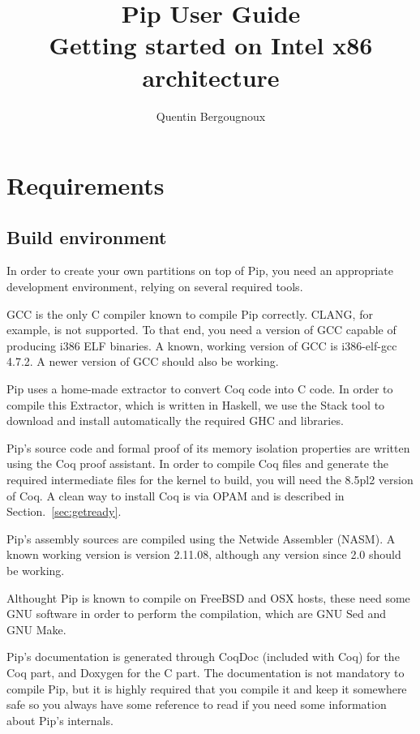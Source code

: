 \documentclass[10pt,a4paper,titlepage]{refart}
\author{Quentin Bergougnoux}
\title{Pip User Guide \\ Getting started on Intel x86 architecture}
\begin{document}
\maketitle
\tableofcontents
{}
\lstlistoflistings
\pagebreak
\section{Requirements}
\subsection{Build environment}
In order to create your own partitions on top of Pip, you need an appropriate development environment, relying on several required tools.

GCC is the only C compiler known to compile Pip correctly. CLANG, for example, is not supported. To that end, you need a version of GCC capable of producing i386 ELF binaries. A known, working version of GCC is i386-elf-gcc 4.7.2. A newer version of GCC should also be working.

Pip uses a home-made extractor to convert Coq code into C code. In order to compile this Extractor, which is written in Haskell, we use the Stack tool to download and install automatically the required GHC and libraries.

Pip's source code and formal proof of its memory isolation properties are written
using the Coq proof assistant. In order to compile Coq files and
generate the required intermediate files for the kernel to build, you will need the 8.5pl2 version of Coq.  A clean way to install Coq is via OPAM and is described in Section.~\ref{sec:getready}.

Pip's assembly sources are compiled using the Netwide Assembler (NASM). A known working version is version 2.11.08, although any version since 2.0 should be working.

Althought Pip is known to compile on FreeBSD and OSX hosts, these need some GNU software in order to perform the compilation, which are GNU Sed and GNU Make. 

Pip's documentation is generated through CoqDoc (included with Coq) for the Coq part, and Doxygen for the C part. The documentation is not mandatory to compile Pip, but it is highly required that you compile it and keep it somewhere safe so you always have some reference to read if you need some information about Pip's internals.
\end{document}
